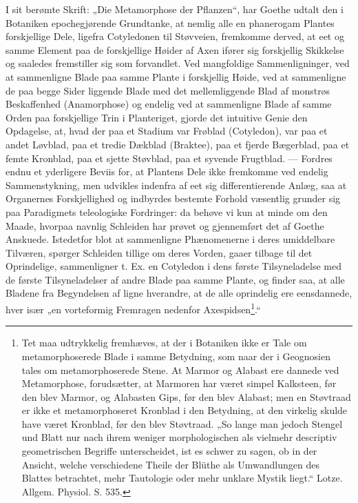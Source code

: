 \documentclass[12pt,a4paper]{book}
\begin{document}
I sit berømte Skrift: „Die Metamorphose der Pflanzen“, har Goethe udtalt
den i Botaniken epochegjørende Grundtanke, at nemlig alle en phanerogam
Plantes forskjellige Dele, ligefra Cotyledonen til Støvveien, fremkomme
derved, at eet og samme Element paa de forskjellige Høider af Axen
ifører sig forskjellig Skikkelse og saaledes fremstiller sig som
forvandlet. Ved mangfoldige Sammenligninger, ved at sammenligne Blade
paa samme Plante i forskjellig Høide, ved at sammenligne de paa begge
Sider liggende Blade med det mellemliggende Blad af monstrøs
Beskaffenhed (Anamorphose) og endelig ved at sammenligne Blade af samme
Orden paa forskjellige Trin i Planteriget, gjorde det intuitive Genie
den Opdagelse, at, hvad der paa et Stadium var Frøblad (Cotyledon), var
paa et andet Løvblad, paa et tredie Dækblad (Braktee), paa et fjerde
Bægerblad, paa et femte Kronblad, paa et sjette Støvblad, paa et syvende
Frugtblad. --- Fordres endnu et yderligere Beviis for, at Plantens Dele
ikke fremkomme ved endelig
\setcounter{footnote}{0}
Sammenstykning, men udvikles indenfra af eet sig differentierende Anlæg,
saa at Organernes Forskjellighed og indbyrdes bestemte Forhold
væsentlig grunder sig paa Paradigmets teleologiske Fordringer: da behøve
vi kun at minde om den Maade, hvorpaa navnlig Schleiden har prøvet og
gjennemført det af Goethe Anskuede. Istedetfor blot at sammenligne
Phænomenerne i deres umiddelbare Tilværen, spørger Schleiden tillige om
deres Vorden, gaaer tilbage til det Oprindelige, sammenligner t. Ex. en
Cotyledon i dens første Tilsyneladelse med de første Tilsyneladelser af
andre Blade paa samme Plante, og finder saa, at alle Bladene fra
Begyndelsen af ligne hverandre, at de alle oprindelig ere eensdannede,
hver især „en vorteformig Fremragen nedenfor
Axespidsen\footnote{%
Tet maa udtrykkelig fremhæves, at der i Botaniken ikke er Tale om
metamorphoserede Blade i samme Betydning, som naar der i Geognosien
tales om metamorphoserede Stene. At Marmor og Alabast ere dannede ved
Metamorphose, forudsætter, at Marmoren har været simpel Kalksteen, før
den blev Marmor, og Alabasten Gips, før den blev Alabast; men en
Støvtraad er ikke et metamorphoseret Kronblad i den Betydning, at den
virkelig skulde have været Kronblad, før den blev Støvtraad. „So lange
man jedoch Stengel und Blatt nur nach ihrem weniger morphologischen als
vielmehr descriptiv geometrischen Begriffe unterscheidet, ist es schwer
zu sagen, ob in der Ansicht, welche verschiedene Theile der Blüthe als
Umwandlungen des Blattes betrachtet, mehr Tautologie oder mehr unklare
Mystik liegt.“ Lotze. Allgem. Physiol. S. 535.}.“
\end{document}
